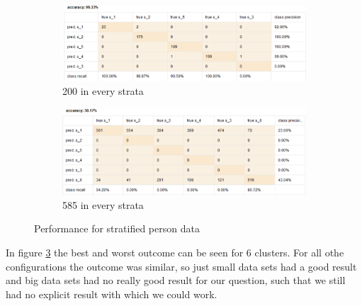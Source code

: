 \begin{figure}[!htbp]
\centering
\begin{subfigure}{0.9\textwidth}
\includegraphics[width = \linewidth]{Dec200eqPrec.PNG}
\caption{200 in every strata}
\label{fig:decvec200}
\end{subfigure}
\begin{subfigure}{0.9\textwidth}
\includegraphics[width= \linewidth]{decvec585pre.PNG}
\caption{585 in every strata}
\label{fig:DecVec585}
\end{subfigure}
\caption{Performance for stratified person data}
\label{fig:DecVec}
\end{figure}

In figure \ref{fig:DecVec} the best and worst outcome can be seen for 6 clusters. For all othe configurations the outcome was similar, so just small data sets had a good result and big data sets had no really good result for our question, such that we still had no explicit result with which we could work.